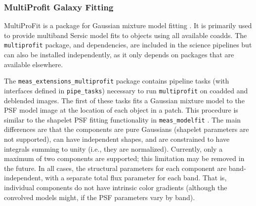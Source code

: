 \subsubsection{MultiProfit Galaxy Fitting}
\label{sec:multiprofit}

MultiProFit is a package for Gaussian mixture model fitting \citep{DMTN-312}.
It is primarily used to provide multiband Sersic model fits to objects using all available coadds.
The \texttt{multiprofit} package, and dependencies, are included in the science pipelines but can also be installed independently, as it only depends on packages that are available elsewhere.

The \texttt{meas\_extensions\_multiprofit} package contains pipeline tasks (with interfaces defined in \texttt{pipe\_tasks}) necessary to run \texttt{multiprofit} on coadded and deblended images.
The first of these tasks fits a Gaussian mixture model to the PSF model image at the location of each object in a patch.
This procedure is similar to the shapelet PSF fitting functionality in \texttt{meas\_modelfit} .
The main differences are that the components are pure Gaussians (shapelet parameters are not supported), can have independent shapes, and are constrained to have integrals summing to unity (i.e., they are normalized).
Currently, only a maximum of two components are supported; this limitation may be removed in the future.
In all cases, the structural parameters for each component are band-independent, with a separate total flux parameter for each band.
That is, individual components do not have intrinsic color gradients (although the convolved models might, if the PSF parameters vary by band).
